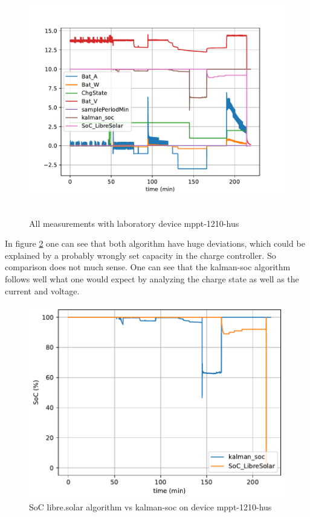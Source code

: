 \begin{figure}[h!]
\centering	
\includegraphics[width=16cm,height=10cm]{mppt-1210-hus-2021-05-28T20:10:00.000Z-2021-05-29T02:19:00.000Z-librevskalman-all.pdf}
\caption{\label{fig:librevskalman-mppt-1210-hus-all} All measurements with laboratory device mppt-1210-hus}
\end{figure}

\pagebreak 

In figure \ref{fig:librevskalman-mppt-hus} one can see that both algorithm have huge deviations, which could be explained by a probably wrongly set capacity in the charge controller. So comparison does not much sense. One can see that the kalman-soc algorithm follows well what one would expect by analyzing the charge state as well as the current and voltage. 

\begin{figure}[h!]
\centering	
\includegraphics{mppt-1210-hus-2021-05-28T20:10:00.000Z-2021-05-29T02:19:00.000Z-librevskalman.pdf}
\caption{\label{fig:librevskalman-mppt-hus} SoC libre.solar algorithm vs kalman-soc on device mppt-1210-hus}
\end{figure}

